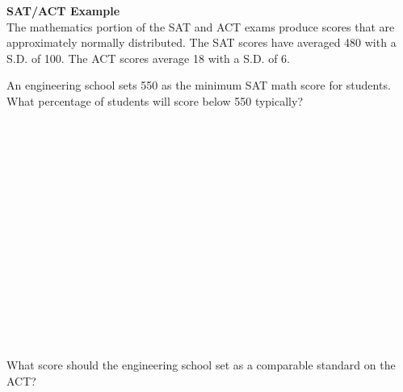 \textbf{SAT/ACT Example}\\
The mathematics portion of the SAT and ACT exams produce scores that are approximately normally distributed.  The SAT scores have averaged 480 with a S.D. of 100.  The ACT scores average 18 with a S.D. of 6.
\be
\item An engineering school sets 550 as the minimum SAT math score for students.  What percentage of students will score below 550 typically?\\~\\~\\~\\~\\~\\~\\~\\~\\~\\~\\~\\~\\~\\~\\~\\
\item What score should the engineering school set as a comparable standard on the ACT?
\ee










